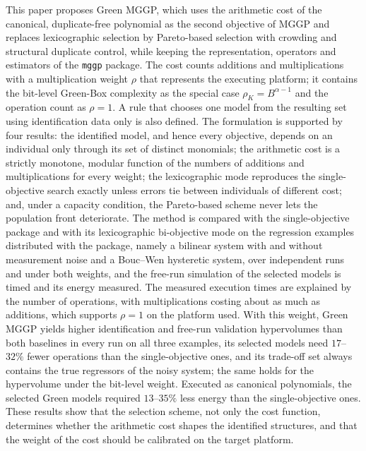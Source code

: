 This paper proposes Green MGGP, which uses the arithmetic cost of the canonical, duplicate-free polynomial as the
second objective of MGGP and replaces lexicographic selection by Pareto-based selection with crowding and structural
duplicate control, while keeping the representation, operators and estimators of the \texttt{mggp} package. The cost
counts additions and multiplications with a multiplication weight $\rho$ that represents the executing platform; it
contains the bit-level Green-Box complexity as the special case $\rho_K=B^{\alpha-1}$ and the operation count as $\rho=1$.
A rule that chooses one model from the resulting set using identification data only is also defined. The formulation
is supported by four results: the identified model, and hence every objective, depends on an individual only through
its set of distinct monomials; the arithmetic cost is a strictly monotone, modular function of the numbers of
additions and multiplications for every weight; the lexicographic mode reproduces the single-objective search exactly
unless errors tie between individuals of different cost; and, under a capacity condition, the Pareto-based scheme
never lets the population front deteriorate. The method is compared with the single-objective package and with its
lexicographic bi-objective mode on the regression examples distributed with the package, namely a bilinear system with
and without measurement noise and a Bouc--Wen hysteretic system, over \nSeeds{} independent runs and under both
weights, and the free-run simulation of the selected models is timed and its energy measured. The measured execution
times are explained by the number of operations, with multiplications costing about as much as additions, which
supports $\rho=1$ on the platform used. With this weight, Green MGGP yields higher identification and free-run
validation hypervolumes than both baselines in every run on all three examples, its selected models need
$17$--$32\%$ fewer operations than the single-objective ones, and its trade-off set always contains
the true regressors of the noisy system; the same holds for the hypervolume under the bit-level weight. Executed as
canonical polynomials, the selected Green models required $13$--$35\%$ less energy than the single-objective ones.
These results show that the selection scheme, not only the cost function, determines whether the arithmetic cost shapes
the identified structures, and that the weight of the cost should be calibrated on the target platform.
